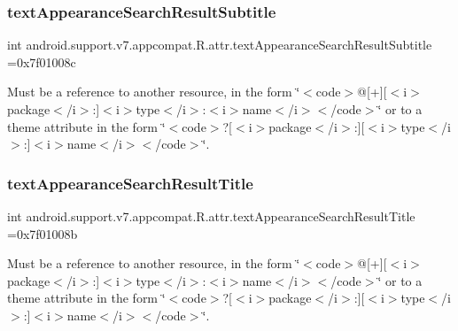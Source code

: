 \subsubsection{\texorpdfstring{text\+Appearance\+Search\+Result\+Subtitle}{textAppearanceSearchResultSubtitle}}
{\footnotesize\ttfamily int android.\+support.\+v7.\+appcompat.\+R.\+attr.\+text\+Appearance\+Search\+Result\+Subtitle =0x7f01008c\hspace{0.3cm}{\ttfamily [static]}}

Must be a reference to another resource, in the form \char`\"{}$<$code$>$@\mbox{[}+\mbox{]}\mbox{[}$<$i$>$package$<$/i$>$\+:\mbox{]}$<$i$>$type$<$/i$>$\+:$<$i$>$name$<$/i$>$$<$/code$>$\char`\"{} or to a theme attribute in the form \char`\"{}$<$code$>$?\mbox{[}$<$i$>$package$<$/i$>$\+:\mbox{]}\mbox{[}$<$i$>$type$<$/i$>$\+:\mbox{]}$<$i$>$name$<$/i$>$$<$/code$>$\char`\"{}. \mbox{\label{classandroid_1_1support_1_1v7_1_1appcompat_1_1R_1_1attr_a43ccbb8c59728fcd3080051a85e6f970}} 
\subsubsection{\texorpdfstring{text\+Appearance\+Search\+Result\+Title}{textAppearanceSearchResultTitle}}
{\footnotesize\ttfamily int android.\+support.\+v7.\+appcompat.\+R.\+attr.\+text\+Appearance\+Search\+Result\+Title =0x7f01008b\hspace{0.3cm}{\ttfamily [static]}}

Must be a reference to another resource, in the form \char`\"{}$<$code$>$@\mbox{[}+\mbox{]}\mbox{[}$<$i$>$package$<$/i$>$\+:\mbox{]}$<$i$>$type$<$/i$>$\+:$<$i$>$name$<$/i$>$$<$/code$>$\char`\"{} or to a theme attribute in the form \char`\"{}$<$code$>$?\mbox{[}$<$i$>$package$<$/i$>$\+:\mbox{]}\mbox{[}$<$i$>$type$<$/i$>$\+:\mbox{]}$<$i$>$name$<$/i$>$$<$/code$>$\char`\"{}. \mbox{\label{classandroid_1_1support_1_1v7_1_1appcompat_1_1R_1_1attr_aac7d2624167851427132ba8fa60937f5}} 
